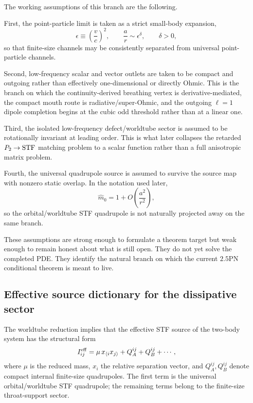 \documentclass[11pt]{article}
\begin{document}
The working assumptions of this branch are the following.

First, the point-particle limit is taken as a strict small-body expansion,
\[
\epsilon\equiv \left(\frac{v}{c}\right)^2,
\qquad
\frac{a}{r}\sim \epsilon^\delta,
\qquad
\delta>0,
\]
so that finite-size channels may be consistently separated from universal point-particle
channels.

Second, low-frequency scalar and vector outlets are taken to be compact and outgoing rather
than effectively one-dimensional or directly Ohmic.  This is the branch on which the
continuity-derived breathing vertex is derivative-mediated, the compact mouth route is
radiative/super-Ohmic, and the outgoing $\ell=1$ dipole completion begins at the cubic odd
threshold rather than at a linear one.

Third, the isolated low-frequency defect/worldtube sector is assumed to be rotationally
invariant at leading order.  This is what later collapses the retarded $P_2\to{\rm STF}$
matching problem to a scalar function rather than a full anisotropic matrix problem.

Fourth, the universal quadrupole source is assumed to survive the source map with nonzero
static overlap.  In the notation used later,
\[
\hat m_0 = 1 + O\!\left(\frac{a^2}{r^2}\right),
\]
so the orbital/worldtube STF quadrupole is not naturally projected away on the same
branch.

These assumptions are strong enough to formulate a theorem target but weak enough to remain
honest about what is still open.  They do not yet solve the completed PDE.  They identify
the natural branch on which the current $2.5$PN conditional theorem is meant to live.

\subsection{Effective source dictionary for the dissipative sector}
\label{sec:dictionary-target-source}

The worldtube reduction implies that the effective STF source of the two-body system has
the structural form
\[
I_{ij}^{\rm eff}
=
\mu\,x_{\langle i}x_{j\rangle}
+Q_A^{ij}+Q_B^{ij}+\cdots,
\]
where $\mu$ is the reduced mass, $x_i$ the relative separation vector, and
$Q_A^{ij},Q_B^{ij}$ denote compact internal finite-size quadrupoles.  The first term is the
universal orbital/worldtube STF quadrupole; the remaining terms belong to the finite-size
throat-support sector.
\end{document}
